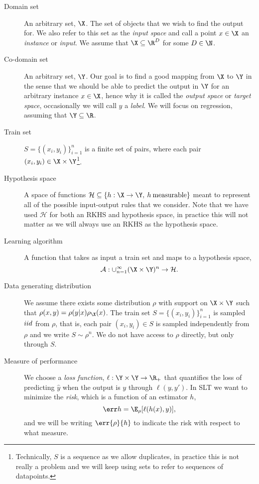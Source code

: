 \begin{description}
\item[{Domain set}] An arbitrary set, \(\X\). The set of objects that we wish to
find the output for. We also refer to this set as the \emph{input space} and
call a point \(x \in \X\) an \emph{instance} or \emph{input}. We assume that
\(\X \subseteq \R^{D}\) for some \(D \in \N\).
\item[{Co-domain set}] An arbitrary set, \(\Y\). Our goal is to find a good
mapping from \(\X\) to \(\Y\) in the sense that we should be able to predict the
output in \(\Y\) for an arbitrary instance \(x \in \X\), hence why it is called
the \emph{output space} or \emph{target space}, occasionally we will call \(y\)
a \emph{label}. We will focus on regression, assuming that \(\Y \subseteq \R\).
\item[{Train set}] \(S = \{(x_{i}, y_{i})\}_{i=1}^{n}\) is a finite set of
pairs, where each pair \((x_{i}, y_{i}) \in \X \times \Y\)\footnote{Technically,
\(S\) is a sequence as we allow duplicates, in practice this is not really a
problem and we will keep using sets to refer to sequences of datapoints.}.
\item[{Hypothesis space}] A space of functions \(\mathcal{H} \subseteq \{h : \X
\to \Y, \: h \: \mathrm{measurable}\}\) meant to represent all of the possible
input-output rules that we consider. Note that we have used \(\mathcal{H}\) for
both an RKHS and hypothesis space, in practice this will not matter as we will
always use an RKHS as the hypothesis space.
\item[{Learning algorithm}] A function that takes as input a train set and maps
  to a hypothesis space,
  \begin{equation}
    \label{eq:sl-algorithm}
    \algo : \cup_{n=1}^{\infty} (\X \times \Y)^{n} \to \mathcal{H}.
  \end{equation}
\item[{Data generating distribution}] We assume there exists some distribution
\(\rho\) with support on \(\X \times \Y\) such that \(\rho(x, y) = \rho(y |
x)\rho_{\X}(x)\). The train set \(S = \{(x_{i}, y_{i})\}_{i=1}^{n}\) is sampled
\(iid\) from \(\rho\), that is, each pair \((x_{i}, y_{i}) \in S\) is sampled
independently from \(\rho\) and we write \(S \sim \rho^{n}\). We do not have
access to \(\rho\) directly, but only through \(S\).
\item[{Measure of performance}] We choose a \emph{loss function}, \(\ell : \Y
\times \Y \to \R_{+}\) that quantifies the loss of predicting \(\hat{y}\) when
the output is \(y\) through \(\ell(y, y')\). In SLT we want to minimize
the \emph{risk}, which is a function of an estimator \(h\),
\begin{equation*}
\label{eq:def-risk} \risk{}{h} = \E_{\rho}[\ell(h(x), y)],
\end{equation*} and we will be writing \(\err{\rho}{h}\) to indicate the risk
with respect to what measure.
\end{description}

